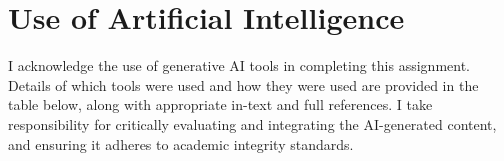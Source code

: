 






\section*{Use of Artificial Intelligence}
\noindent
I acknowledge the use of generative AI tools in completing this assignment. Details of which tools were used and how they were used are provided in the table below, along with appropriate in-text and full references. I take responsibility for critically evaluating and integrating the AI-generated content, and ensuring it adheres to academic integrity standards. 


